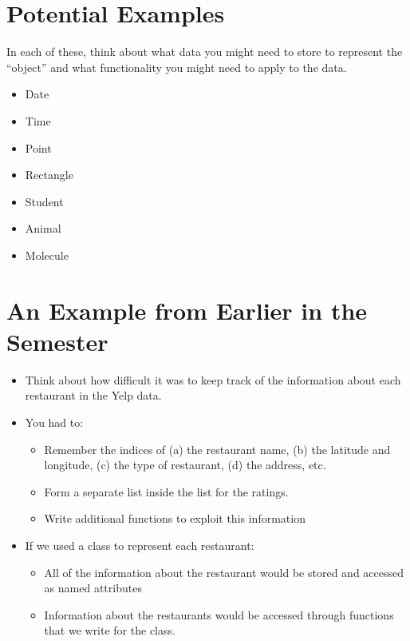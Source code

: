 \documentclass[letterpaper,10pt,english]{sphinxmanual}
\begin{document}
\section{Potential Examples}
\label{\detokenize{lecture_notes/lec18_classes1:potential-examples}}
In each of these, think about what data you might need to store to
represent the “object” and what functionality you might need to apply to
the data.
\begin{itemize}
\item {} 
Date

\item {} 
Time

\item {} 
Point

\item {} 
Rectangle

\item {} 
Student

\item {} 
Animal

\item {} 
Molecule

\end{itemize}


\section{An Example from Earlier in the Semester}
\label{\detokenize{lecture_notes/lec18_classes1:an-example-from-earlier-in-the-semester}}\begin{itemize}
\item {} 
Think about how difficult it was to keep track of the information
about each restaurant in the Yelp data.

\item {} 
You had to:
\begin{itemize}
\item {} 
Remember the indices of (a) the restaurant name, (b) the latitude
and longitude, (c) the type of restaurant, (d) the address, etc.

\item {} 
Form a separate list inside the list for the ratings.

\item {} 
Write additional functions to exploit this information

\end{itemize}

\item {} 
If we used a class to represent each restaurant:
\begin{itemize}
\item {} 
All of the information about the restaurant would be stored and
accessed as named attributes

\item {} 
Information about the restaurants would be accessed through
functions that we write for the class.

\end{itemize}

\end{itemize}
\end{document}
